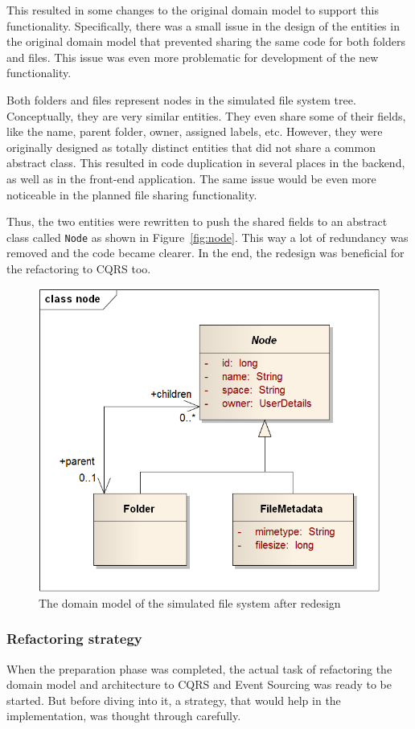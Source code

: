 \documentclass{book}
\begin{document}
This resulted in some changes to the original domain model to support
this functionality. Specifically, there was a small issue in the design
of the entities in the original domain model that prevented sharing the
same code for both folders and files. This issue was even more
problematic for development of the new functionality.

Both folders and files represent nodes in the simulated file system
tree. Conceptually, they are very similar entities. They even share some
of their fields, like the name, parent folder, owner, assigned labels,
etc. However, they were originally designed as totally distinct entities
that did not share a common abstract class. This resulted in code
duplication in several places in the backend, as well as in the
front-end application. The same issue would be even more noticeable in
the planned file sharing functionality.

Thus, the two entities were rewritten to push the shared fields to an
abstract class called \texttt{Node} as shown in Figure~\ref{fig:node}.
This way a lot of redundancy was removed and the code became clearer. In
the end, the redesign was beneficial for the refactoring to CQRS too.


\begin{figure}[h!]
\begin{center}
\includegraphics[width=0.49\columnwidth]{figures/node/node}
\caption{The domain model of the simulated file system after redesign%
}
\end{center}
\end{figure}

\subsubsection{Refactoring strategy}\label{refactoring-strategy}

When the preparation phase was completed, the actual task of refactoring
the domain model and architecture to CQRS and Event Sourcing was ready
to be started. But before diving into it, a strategy, that would help in
the implementation, was thought through carefully.
\end{document}
